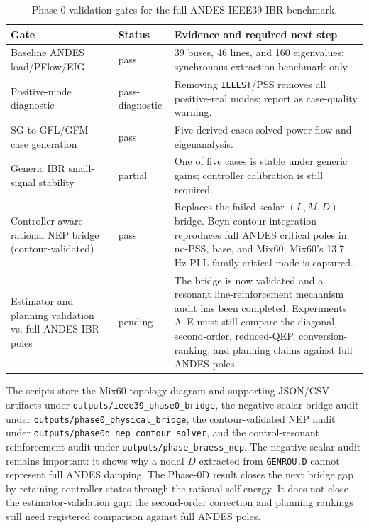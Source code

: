 \documentclass[journal]{IEEEtran}
\begin{document}
\begin{table}[t]
\centering
\caption{Phase-0 validation gates for the full ANDES IEEE39 IBR benchmark.}
\label{tab:phase0gates}
\begin{tabular}{p{}p{}p{}}
\toprule
Gate & Status & Evidence and required next step\\
\midrule
Baseline ANDES load/PFlow/EIG & pass & 39 buses, 46 lines, and 160 eigenvalues; synchronous extraction benchmark only.\\
Positive-mode diagnostic & pass-diagnostic & Removing \texttt{IEEEST}/PSS removes all positive-real modes; report as case-quality warning.\\
SG-to-GFL/GFM case generation & pass & Five derived cases solved power flow and eigenanalysis.\\
Generic IBR small-signal stability & partial & One of five cases is stable under generic gains; controller calibration is still required.\\
Controller-aware rational NEP bridge (contour-validated) & pass & Replaces the failed scalar $(L,M,D)$ bridge. Beyn contour integration reproduces full ANDES critical poles in no-PSS, base, and Mix60; Mix60's 13.7 Hz PLL-family critical mode is captured.\\
Estimator and planning validation vs. full ANDES IBR poles & pending & The bridge is now validated and a resonant line-reinforcement mechanism audit has been completed. Experiments A--E must still compare the diagonal, second-order, reduced-QEP, conversion-ranking, and planning claims against full ANDES poles.\\
\bottomrule
\end{tabular}
\end{table}

The scripts store the Mix60 topology diagram and supporting JSON/CSV artifacts under \texttt{outputs/ieee39\_phase0\_bridge}, the negative scalar bridge audit under \texttt{outputs/phase0\_physical\_bridge}, the contour-validated NEP audit under \texttt{outputs/phase0d\_nep\_contour\_solver}, and the control-resonant reinforcement audit under \texttt{outputs/phase\_braess\_nep}. The negative scalar audit remains important: it shows why a nodal $D$ extracted from \texttt{GENROU.D} cannot represent full ANDES damping. The Phase-0D result closes the next bridge gap by retaining controller states through the rational self-energy. It does not close the estimator-validation gap: the second-order correction and planning rankings still need registered comparison against full ANDES poles.
\end{document}

